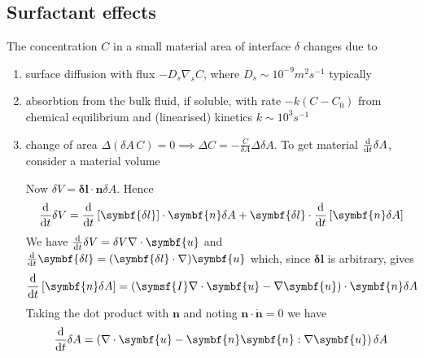 \documentclass{jknotes}
\begin{document}
\subsection{Surfactant effects}
The concentration $C$ in a small material area of interface $\delta $ changes
due to
\begin{enumerate}
	\item surface diffusion with flux $- D_s \nabla_s C$, where $D_s \sim
		10^{-9} m^2 s^{-1}$ typically
	\item absorbtion from the bulk fluid, if soluble, with rate $-k(C-C_0)$
		from chemical equilibrium and (linearised) kinetics $k \sim 10^3
		s^{-1}$
	\item change of area $\Delta (\delta A\, C) = 0 \implies \Delta C =
		-\frac{C}{\delta A} \Delta \delta A$. To get material
		$\frac{\diffd}{\diffd t} \delta A$, consider a material volume
		\begin{center}
		\end{center}
		Now $\delta V = \symbf{\delta l} \cdot \symbf{n} \delta A$. Hence
		\begin{equation}
			\frac{\diffd}{\diffd t} \delta V = \frac{\diffd}{\diffd t}
			\left[\symbf{\delta l}\right] \cdot \symbf{n} \delta A + \symbf{\delta l} \cdot
			\frac{\diffd}{\diffd t}\left[ \symbf{n} \delta A\right]
		\end{equation}
		We have $\frac{\diffd}{\diffd t} \delta V = \delta V \nabla \cdot
		\symbf{u}$ and $\frac{\diffd}{\diffd t} \symbf{\delta l} =
		(\symbf{\delta l} \cdot \nabla) \symbf{u}$ which, since $\symbf{\delta
		l}$ is arbitrary, gives
		\begin{equation}
			\frac{\diffd}{\diffd t} \left[ \symbf{n} \delta A \right] = \left(
			\symsf{I} \nabla \cdot \symbf{u} - \nabla \symbf{u} \right) \cdot
			\symbf{n} \delta A
		\end{equation}
		Taking the dot product with $\symbf{n}$ and noting $\symbf{n} \cdot
		\dot{\symbf{n}} = 0$ we have
		\begin{align}
			\frac{\diffd}{\diffd t} \delta A &= \left( \nabla \cdot \symbf{u}
			- \symbf{n} \symbf{n} : \nabla \symbf{u}\right) \delta A \\

\end{align}
\end{enumerate}
\end{document}
